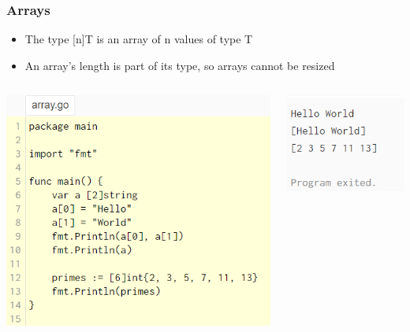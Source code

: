 \documentclass[14pt]{beamer}
\begin{document}
{
\begin{frame}
    \frametitle{Arrays}
    \begin{itemize}
        \item The type [n]T is an array of n values of type T
        \item An array's length is part of its type, so arrays cannot be resized
    \end{itemize}
    \begin{columns}
        \begin{column}{0.5\textwidth}
            \includegraphics[width=\linewidth]{img/array.PNG}
        \end{column}
        \begin{column}{0.5\textwidth}
            \includegraphics[width=0.5\linewidth]{img/arrayoutput.PNG}
        \end{column}
    \end{columns}
\end{frame}
}
\end{document}
